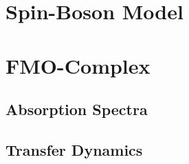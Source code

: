 \section{Spin-Boson Model}
\label{sec:num.spin_boson}


\section{FMO-Complex}
\label{sec:num.fmo}


\subsection{Absorption Spectra}
\label{sub:num.fmo.absorption}

\subsection{Transfer Dynamics}
\label{sub:num.fmo.dynamics}

